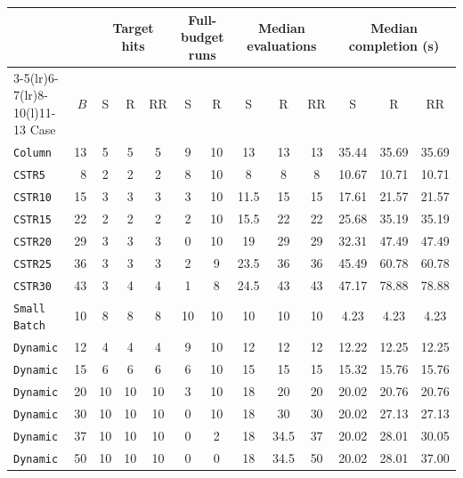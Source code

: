 \begin{tabular}{@{}lrccccccccccc@{}}\toprule
 & & \multicolumn{3}{c}{Target hits} & \multicolumn{2}{c}{Full-budget runs} & \multicolumn{3}{c}{Median evaluations} & \multicolumn{3}{c}{Median completion (s)}\\\cmidrule(lr){3-5}\cmidrule(lr){6-7}\cmidrule(lr){8-10}\cmidrule(l){11-13}
Case & \(B\) & S & R & RR & S & R & S & R & RR & S & R & RR\\\midrule
\texttt{Column} & 13 & 5 & 5 & 5 & 9 & 10 & 13 & 13 & 13 & 35.44 & 35.69 & 35.69 \\
\texttt{CSTR5} & 8 & 2 & 2 & 2 & 8 & 10 & 8 & 8 & 8 & 10.67 & 10.71 & 10.71 \\
\texttt{CSTR10} & 15 & 3 & 3 & 3 & 3 & 10 & 11.5 & 15 & 15 & 17.61 & 21.57 & 21.57 \\
\texttt{CSTR15} & 22 & 2 & 2 & 2 & 2 & 10 & 15.5 & 22 & 22 & 25.68 & 35.19 & 35.19 \\
\texttt{CSTR20} & 29 & 3 & 3 & 3 & 0 & 10 & 19 & 29 & 29 & 32.31 & 47.49 & 47.49 \\
\texttt{CSTR25} & 36 & 3 & 3 & 3 & 2 & 9 & 23.5 & 36 & 36 & 45.49 & 60.78 & 60.78 \\
\texttt{CSTR30} & 43 & 3 & 4 & 4 & 1 & 8 & 24.5 & 43 & 43 & 47.17 & 78.88 & 78.88 \\
\texttt{Small Batch} & 10 & 8 & 8 & 8 & 10 & 10 & 10 & 10 & 10 & 4.23 & 4.23 & 4.23 \\
\texttt{Dynamic} & 12 & 4 & 4 & 4 & 9 & 10 & 12 & 12 & 12 & 12.22 & 12.25 & 12.25 \\
\texttt{Dynamic} & 15 & 6 & 6 & 6 & 6 & 10 & 15 & 15 & 15 & 15.32 & 15.76 & 15.76 \\
\texttt{Dynamic} & 20 & 10 & 10 & 10 & 3 & 10 & 18 & 20 & 20 & 20.02 & 20.76 & 20.76 \\
\texttt{Dynamic} & 30 & 10 & 10 & 10 & 0 & 10 & 18 & 30 & 30 & 20.02 & 27.13 & 27.13 \\
\texttt{Dynamic} & 37 & 10 & 10 & 10 & 0 & 2 & 18 & 34.5 & 37 & 20.02 & 28.01 & 30.05 \\
\texttt{Dynamic} & 50 & 10 & 10 & 10 & 0 & 0 & 18 & 34.5 & 50 & 20.02 & 28.01 & 37.00 \\
\bottomrule\end{tabular}
